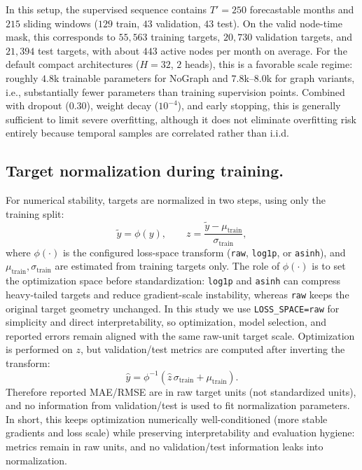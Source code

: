 \documentclass[pdflatex,sn-basic]{sn-jnl}
\begin{document}
In this setup, the supervised sequence contains \(T'=250\) forecastable months and \(215\) sliding windows
(\(129\) train, \(43\) validation, \(43\) test). On the valid node-time mask, this corresponds to
\(55{,}563\) training targets, \(20{,}730\) validation targets, and \(21{,}394\) test targets, with
about \(443\) active nodes per month on average. For the default compact architectures
(\(H=32\), \(2\) heads), this is a favorable scale regime: roughly \(4.8\)k trainable parameters for
NoGraph and \(7.8\)k--\(8.0\)k for graph variants, i.e., substantially fewer parameters than training
supervision points. Combined with dropout (\(0.30\)), weight decay (\(10^{-4}\)), and early stopping,
this is generally sufficient to limit severe overfitting, although it does not eliminate overfitting risk
entirely because temporal samples are correlated rather than i.i.d.

\subsection{Target normalization during training.}
For numerical stability, targets are normalized in two steps, using only the training split:
\[
\tilde{y}=\phi(y), \qquad z=\frac{\tilde{y}-\mu_{\text{train}}}{\sigma_{\text{train}}},
\]
where $\phi(\cdot)$ is the configured loss-space transform (\texttt{raw}, \texttt{log1p}, or \texttt{asinh}), and
$\mu_{\text{train}},\sigma_{\text{train}}$ are estimated from training targets only.
The role of $\phi(\cdot)$ is to set the optimization space before standardization:
\texttt{log1p} and \texttt{asinh} can compress heavy-tailed targets and reduce gradient-scale instability,
whereas \texttt{raw} keeps the original target geometry unchanged.
In this study we use \texttt{LOSS\_SPACE=raw} for simplicity and direct interpretability,
so optimization, model selection, and reported errors remain aligned with the same raw-unit target scale.
Optimization is performed on $z$, but validation/test metrics are computed after inverting the transform:
\[
\hat{y}=\phi^{-1}\!\left(\hat{z}\,\sigma_{\text{train}}+\mu_{\text{train}}\right).
\]
Therefore reported MAE/RMSE are in raw target units (not standardized units), and no information from validation/test
is used to fit normalization parameters.
In short, this keeps optimization numerically well-conditioned (more stable gradients and loss scale) while preserving
interpretability and evaluation hygiene: metrics remain in raw units, and no validation/test information leaks into
normalization.
\end{document}
